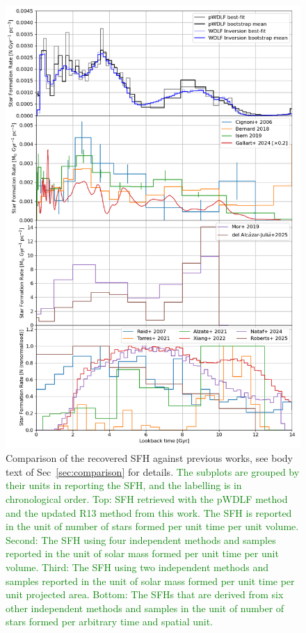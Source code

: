 \documentclass[fleqn,usenatbib]{mnras}
\begin{document}
\begin{figure}
  \includegraphics[width=\columnwidth]{figures/fig_10_compare_sfh.png}
  \caption{Comparison of the recovered SFH against previous works, see body
  text of Sec~\ref{sec:comparison} for details. \textcolor{green}{The subplots are 
  grouped by their units in reporting the SFH, and the labelling is in
  chronological order. Top: SFH retrieved with the
  pWDLF method and the updated R13 method from this work. The SFH is reported
  in the unit of number of stars formed per unit time per unit volume.
  Second: The SFH using four independent methods and samples reported in the
  unit of solar mass formed per unit time per unit volume. Third: The SFH using
  two independent methods and samples reported in the unit of solar mass formed
  per unit time per unit projected area. Bottom: The SFHs that are derived from
  six other independent methods and samples in the unit of number of stars formed
  per arbitrary time and spatial unit.}}
  \label{fig:comparison}
\end{figure}
\end{document}
